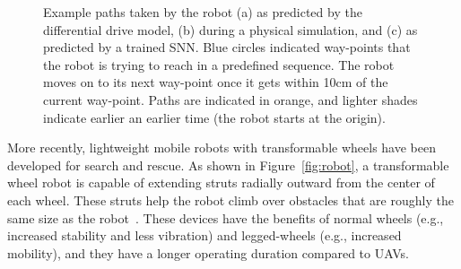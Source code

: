\begin{figure}[ht]
    \centering
    \hfil
    \hfil
    \caption{Example paths taken by the robot (a) as predicted by the differential drive model, (b) during a physical simulation, and (c) as predicted by a trained SNN. Blue circles indicated way-points that the robot is trying to reach in a predefined sequence. The robot moves on to its next way-point once it gets within 10\si{cm} of the current way-point. Paths are indicated in orange, and lighter shades indicate earlier an earlier time (the robot starts at the origin).}
    \label{fig:paths}
\end{figure}

More recently, lightweight mobile robots with transformable wheels have been developed for search and rescue.
%
As shown in Figure~\ref{fig:robot}, a transformable wheel robot is capable of extending struts radially outward from the center of each wheel. These struts help the robot climb over obstacles that are roughly the same size as the robot~\citep{Clark.2018.C.EvolvingControllersTransformable}.
%
These devices have the benefits of normal wheels (e.g., increased stability and less vibration) and legged-wheels (e.g., increased mobility), and they have a longer operating duration compared to UAVs.


